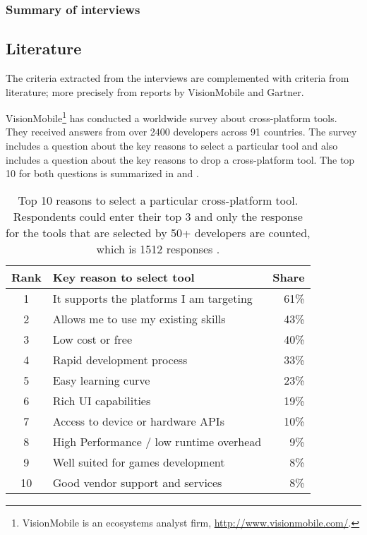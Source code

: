 \subsubsection*{Summary of interviews}

\TODO{}

\subsection{Literature}

The criteria extracted from the interviews are complemented with criteria from literature; more precisely from reports by VisionMobile and Gartner. 

VisionMobile\footnote{VisionMobile is an ecosystems analyst firm, \url{http://www.visionmobile.com/}.} has conducted a worldwide survey about cross-platform tools. They received answers from over 2400 developers across 91 countries. The survey includes a question about the key reasons to select a particular tool and also includes a question about the key reasons to drop a cross-platform tool. The top 10 for both questions is summarized in  and .

\begin{table}[h]
    \begin{center}
        \begin{tabular}{clr}
            \hline
            Rank & Key reason to select tool & Share \\
            \hline
            1  & It supports the platforms I am targeting & 61\% \\
            2  & Allows me to use my existing skills & 43\% \\
            3  & Low cost or free & 40\% \\
            4  & Rapid development process & 33\% \\
            5  & Easy learning curve & 23\% \\
            6  & Rich UI capabilities & 19\% \\
            7  & Access to device or hardware APIs & 10\% \\
            8  & High Performance / low runtime overhead & 9\% \\
            9  & Well suited for games development & 8\% \\
            10 & Good vendor support and services & 8\% \\
            \hline
        \end{tabular}
        \caption{Top 10 reasons to select a particular cross-platform tool. Respondents could enter their top 3 and only the response for the tools that are selected by 50+ developers are counted, which is 1512 responses \cite{VMCPT:2012}.}
        \label{tab:select}
    \end{center}
\end{table}


